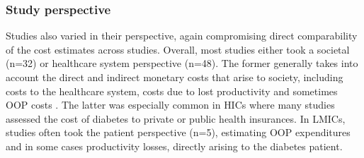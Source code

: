 \subsubsection{Study perspective}
Studies also varied in their perspective, again compromising direct comparability of the cost estimates across studies. Overall, most studies either took a societal (n=32) or healthcare system perspective (n=48). The former generally takes into account the direct and indirect monetary costs that arise to society, including costs to the healthcare system, costs due to lost productivity and sometimes \ac{OOP} costs \parencite{Segel2006}. The latter was especially common in \acp{HIC} where many studies assessed the cost of diabetes to private or public health insurances. In \acp{LMIC}, studies often took the patient perspective (n=5), estimating \ac{OOP} expenditures and in some cases productivity losses, directly arising to the diabetes patient.

